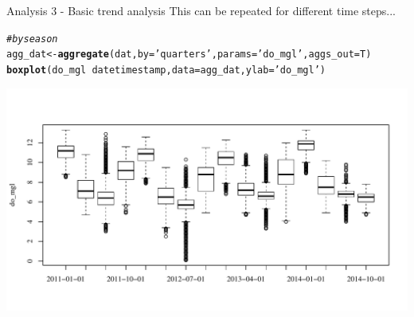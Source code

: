 \documentclass[xcolor=svgnames]{beamer}\usepackage[]{graphicx}\usepackage[]{color}
\makeatletter
\newcommand{\hlstr}[1]{\textcolor[rgb]{0.192,0.494,0.8}{#1}}%
\newcommand{\hlcom}[1]{\textcolor[rgb]{0.678,0.584,0.686}{\textit{#1}}}%
\newcommand{\hlopt}[1]{\textcolor[rgb]{0,0,0}{#1}}%
\newcommand{\hlstd}[1]{\textcolor[rgb]{0.345,0.345,0.345}{#1}}%
\newcommand{\hlkwb}[1]{\textcolor[rgb]{0.69,0.353,0.396}{#1}}%
\newcommand{\hlkwc}[1]{\textcolor[rgb]{0.333,0.667,0.333}{#1}}%
\newcommand{\hlkwd}[1]{\textcolor[rgb]{0.737,0.353,0.396}{\textbf{#1}}}%
\newenvironment{kframe}{%
 \def\at@end@of@kframe{}%
 \ifinner\ifhmode%
  \def\at@end@of@kframe{\end{minipage}}%
  \begin{minipage}{\columnwidth}%
 \fi\fi%
 \def\FrameCommand##1{\hskip\@totalleftmargin \hskip-\fboxsep
 \colorbox{shadecolor}{##1}\hskip-\fboxsep
     \hskip-\linewidth \hskip-\@totalleftmargin \hskip\columnwidth}%
 \MakeFramed {\advance\hsize-\width
   \@totalleftmargin\z@ \linewidth\hsize
   \@setminipage}}%
 {\par\unskip\endMakeFramed%
 \at@end@of@kframe}
\newenvironment{knitrout}{}{} %
\makeatother
\begin{document}
\begin{frame}[containsverbatim]{Analysis 3 - Basic trend analysis}
This can be repeated for different time steps...
\begin{knitrout}\scriptsize
{}\color{fgcolor}\begin{kframe}
\begin{alltt}
\hlcom{# by season}
\hlstd{agg_dat} \hlkwb{<-} \hlkwd{aggregate}\hlstd{(dat,} \hlkwc{by} \hlstd{=} \hlstr{'quarters'}\hlstd{,} \hlkwc{params} \hlstd{=} \hlstr{'do_mgl'}\hlstd{,} \hlkwc{aggs_out} \hlstd{= T)}
\hlkwd{boxplot}\hlstd{(do_mgl} \hlopt{~} \hlstd{datetimestamp,} \hlkwc{data} \hlstd{= agg_dat,} \hlkwc{ylab} \hlstd{=} \hlstr{'do_mgl'}\hlstd{)}
\end{alltt}
\end{kframe}

{\centering \includegraphics[width=\textwidth]{figure/unnamed-chunk-19} 

}



\end{knitrout}
\end{frame}
\end{document}
